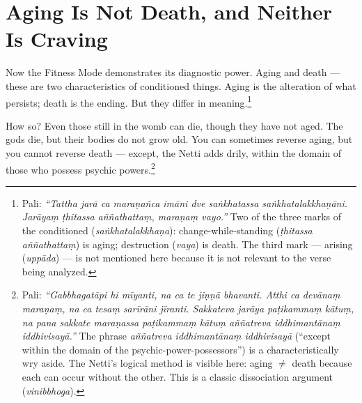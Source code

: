 \section*{Aging Is Not Death, and Neither Is Craving}

Now the Fitness Mode demonstrates its diagnostic power. Aging and death --- these are two characteristics of conditioned things. Aging is the alteration of what persists; death is the ending. But they differ in meaning.\footnote{Pali: \textit{``Tattha jarā ca maraṇañca imāni dve saṅkhatassa saṅkhatalakkhaṇāni. Jarāyaṃ ṭhitassa aññathattaṃ, maraṇaṃ vayo.''} Two of the three marks of the conditioned (\textit{saṅkhatalakkhaṇa}): change-while-standing (\textit{ṭhitassa aññathattaṃ}) is aging; destruction (\textit{vaya}) is death. The third mark --- arising (\textit{uppāda}) --- is not mentioned here because it is not relevant to the verse being analyzed.}

How so? Even those still in the womb can die, though they have not aged. The gods die, but their bodies do not grow old. You can sometimes reverse aging, but you cannot reverse death --- except, the Netti adds drily, within the domain of those who possess psychic powers.\footnote{Pali: \textit{``Gabbhagatāpi hi mīyanti, na ca te jiṇṇā bhavanti. Atthi ca devānaṃ maraṇaṃ, na ca tesaṃ sarīrāni jīranti. Sakkateva jarāya paṭikammaṃ kātuṃ, na pana sakkate maraṇassa paṭikammaṃ kātuṃ aññatreva iddhimantānaṃ iddhivisayā.''} The phrase \textit{aññatreva iddhimantānaṃ iddhivisayā} (``except within the domain of the psychic-power-possessors'') is a characteristically wry aside. The Netti's logical method is visible here: aging $\neq$ death because each can occur without the other. This is a classic dissociation argument (\textit{vinibbhoga}).}

